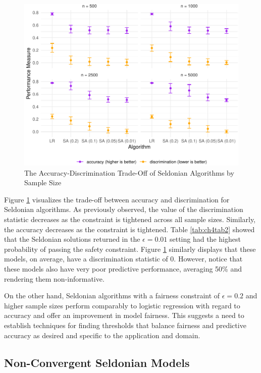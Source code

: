 \documentclass[12pt, twoside]{amherstthesis}
\begin{document}
\begin{figure}

{\centering \includegraphics{Dasha-Asienga_StatThesis_files/figure-latex/ch4fig4-1} 

}

\caption{The Accuracy-Discrimination Trade-Off of Seldonian Algorithms by Sample Size}\label{fig:ch4fig4}
\end{figure}
Figure \ref{fig:ch4fig4} visualizes the trade-off between accuracy and discrimination for Seldonian algorithms. As previously observed, the value of the discrimination statistic decreases as the constraint is tightened across all sample sizes. Similarly, the accuracy decreases as the constraint is tightened. Table \ref{tab:ch4tab2} showed that the Seldonian solutions returned in the \(\epsilon = 0.01\) setting had the highest probability of passing the safety constraint. Figure \ref{fig:ch4fig4} similarly displays that these models, on average, have a discrimination statistic of 0. However, notice that these models also have very poor predictive performance, averaging 50\% and rendering them non-informative.

On the other hand, Seldonian algorithms with a fairness constraint of \(\epsilon = 0.2\) and higher sample sizes perform comparably to logistic regression with regard to accuracy and offer an improvement in model fairness. This suggests a need to establish techniques for finding thresholds that balance fairness and predictive accuracy as desired and specific to the application and domain.

\hypertarget{non-convergent-seldonian-models}{%
\subsection{Non-Convergent Seldonian Models}\label{non-convergent-seldonian-models}}
\end{document}
